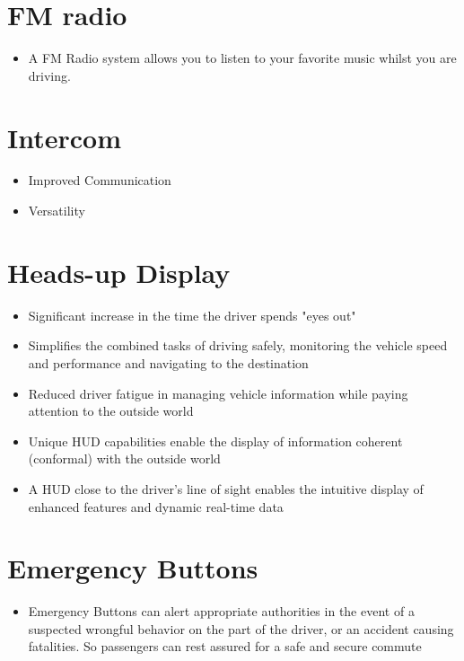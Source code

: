 \section{FM radio }
\begin{itemize}
	\item A FM Radio system allows you to listen to your favorite music whilst you are driving.
\end{itemize}
\section{Intercom }
\begin{itemize}
	\item Improved Communication
	\item Versatility
\end{itemize}
\section{Heads-up Display }
\begin{itemize}
	\item  Significant increase in the time the driver spends "eyes out"
	\item Simplifies the combined tasks of driving safely, monitoring the vehicle speed and performance and navigating to the destination
	\item Reduced driver fatigue in managing vehicle information while paying attention to the outside world
	\item Unique HUD capabilities enable the display of information coherent (conformal) with the outside world
	\item A HUD close to the driver's line of sight enables the intuitive display of enhanced features and dynamic real-time data
\end{itemize}
\section{Emergency Buttons }
\begin{itemize}
	\item Emergency Buttons can alert appropriate authorities in the event of a suspected wrongful behavior on the part of the driver, or an accident causing fatalities. So passengers can rest assured for a safe and secure commute
\end{itemize}
